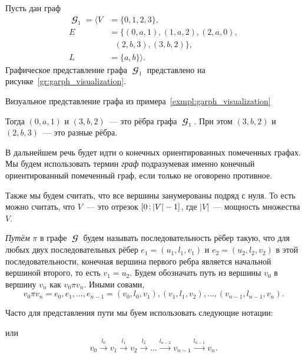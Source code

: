     \begin{example}\label{exmpl:garph_visualization}
        Пусть дан граф
        \begin{align*}
            \mbfscrG_1 = \langle V & =\{0, 1, 2, 3\},                    \\
            E                      & =\{(0, a, 1), (1, a, 2), (2, a, 0), \\
                                   & \ \ \ (2, b, 3), (3, b, 2)\},       \\
            L                      & =\{a, b\} \rangle.
        \end{align*}
        Графическое представление графа $\mbfscrG_1$ представлено на рисунке~\ref{gr:garph_visualization}.
        \begin{marginfigure}
            \begin{center}
                \resizebox{\marginparwidth}{!}{}
            \end{center}
            \caption{Визуальное представление графа из примера~\ref{exmpl:garph_visualization}}
            \label{gr:garph_visualization}
        \end{marginfigure}

        Тогда $(0, a, 1)$ и $(3,b,2)$~--- это рёбра графа $\mbfscrG_1$.
        При этом $(3, b, 2)$ и $(2, b, 3)$~--- это разные рёбра.
    \end{example}

В дальнейшем речь будет идти о конечных ориентированных помеченных графах.
Мы будем использовать термин \emph{граф} подразумевая именно конечный ориентированный помеченный граф, если только не оговорено противное.

Также мы будем считать, что все вершины занумерованы подряд с нуля.
То есть можно считать, что $V$~--- это отрезок $[0 \rng |V| - 1]$, где $|V|$~--- мощность множества $V$.

\begin{definition}[Путь]
    \emph{Путём} $\pi$ в графе $\mbfscrG$ будем называть последовательность рёбер такую, что для любых двух последовательных рёбер $e_1 = (u_1, l_1, v_1)$ и $e_2 = (u_2, l_2, v_2)$ в этой последовательности, конечная вершина первого ребра является начальной вершиной второго, то есть $v_1 = u_2$.
    Будем обозначать путь из вершины $v_0$ в вершину $v_n$ как $v_0 \pi v_n$.
    Иными совами,
    \[v_0 \pi v_n = e_0,e_1, \dots, e_{n-1} = (v_0, l_0, v_1),(v_1,l_1,v_2),\dots,(v_{n-1},l_{n-1},v_n).\]
\end{definition}
Часто для представления пути мы буем использовать следующие нотации:
\begin{center}
    
\end{center}
или
\[
    v_0 \xrightarrow[]{l_0} v_1 \xrightarrow[]{l_1} v_2 \xrightarrow[]{l_2} \ldots \xrightarrow[]{l_{n-2}} v_{n-1} \xrightarrow[]{l_{n-1}} v_n.
\]

